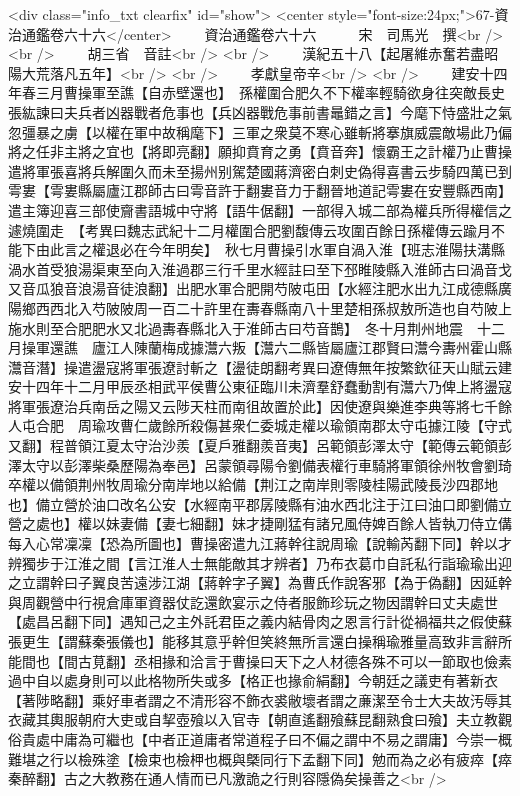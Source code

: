 <div class="info_txt clearfix" id="show">
<center style="font-size:24px;">67-資治通鑑卷六十六</center>
  　　資治通鑑卷六十六　　　宋　司馬光　撰<br />
<br />
　　胡三省　音註<br />
<br />
　　漢紀五十八【起屠維赤奮若盡昭陽大荒落凡五年】<br />
<br />
　　孝獻皇帝辛<br />
<br />
　　建安十四年春三月曹操軍至譙【自赤壁還也】　孫權圍合肥久不下權率輕騎欲身往突敵長史張紘諫曰夫兵者凶器戰者危事也【兵凶器戰危事前書鼂錯之言】今麾下恃盛壯之氣忽彊暴之虜【以權在軍中故稱麾下】三軍之衆莫不寒心雖斬將搴旗威震敵場此乃偏將之任非主將之宜也【將即亮翻】願抑賁育之勇【賁音奔】懷霸王之計權乃止曹操遣將軍張喜將兵解圍久而未至揚州别駕楚國蔣濟密白刺史偽得喜書云步騎四萬已到雩婁【雩婁縣屬廬江郡師古曰雩音許于翻婁音力于翻晉地道記雩婁在安豐縣西南】遣主簿迎喜三部使齎書語城中守將【語牛倨翻】一部得入城二部為權兵所得權信之遽燒圍走　【考異曰魏志武紀十二月權圍合肥劉馥傳云攻圍百餘日孫權傳云踰月不能下由此言之權退必在今年明矣】　秋七月曹操引水軍自渦入淮【班志淮陽扶溝縣渦水首受狼湯渠東至向入淮過郡三行千里水經註曰至下邳睢陵縣入淮師古曰渦音戈又音瓜狼音浪湯音徒浪翻】出肥水軍合肥開芍陂屯田【水經注肥水出九江成德縣廣陽鄉西西北入芍陂陂周一百二十許里在夀春縣南八十里楚相孫叔敖所造也自芍陂上施水則至合肥肥水又北過夀春縣北入于淮師古曰芍音鵲】　冬十月荆州地震　十二月操軍還譙　廬江人陳蘭梅成據灊六叛【灊六二縣皆屬廬江郡賢曰灊今夀州霍山縣灊音潛】操遣盪寇將軍張遼討斬之【盪徒朗翻考異曰遼傳無年按繁欽征天山賦云建安十四年十二月甲辰丞相武平侯曹公東征臨川未濟羣舒蠢動割有灊六乃俾上將盪寇將軍張遼治兵南岳之陽又云陟天柱而南徂故置於此】因使遼與樂進李典等將七千餘人屯合肥　周瑜攻曹仁歲餘所殺傷甚衆仁委城走權以瑜領南郡太守屯據江陵【守式又翻】程普領江夏太守治沙羨【夏戶雅翻羨音夷】呂範領彭澤太守【範傳云範領彭澤太守以彭澤柴桑歷陽為奉邑】呂蒙領尋陽令劉備表權行車騎將軍領徐州牧會劉琦卒權以備領荆州牧周瑜分南岸地以給備【荆江之南岸則零陵桂陽武陵長沙四郡地也】備立營於油口改名公安【水經南平郡孱陵縣有油水西北注于江曰油口即劉備立營之處也】權以妹妻備【妻七細翻】妹才捷剛猛有諸兄風侍婢百餘人皆執刀侍立傋每入心常凜凜【恐為所圖也】曹操密遣九江蔣幹往說周瑜【說輸芮翻下同】幹以才辨獨步于江淮之間【言江淮人士無能敵其才辨者】乃布衣葛巾自託私行詣瑜瑜出迎之立謂幹曰子翼良苦遠涉江湖【蔣幹字子翼】為曹氏作說客邪【為于偽翻】因延幹與周觀營中行視倉庫軍資器仗訖還飲宴示之侍者服飾珍玩之物因謂幹曰丈夫處世【處昌呂翻下同】遇知己之主外託君臣之義内結骨肉之恩言行計從禍福共之假使蘇張更生【謂蘇秦張儀也】能移其意乎幹但笑終無所言還白操稱瑜雅量高致非言辭所能間也【間古莧翻】丞相掾和洽言于曹操曰天下之人材德各殊不可以一節取也儉素過中自以處身則可以此格物所失或多【格正也掾俞絹翻】今朝廷之議吏有著新衣【著陟略翻】乘好車者謂之不清形容不飾衣裘敝壞者謂之亷潔至令士大夫故汚辱其衣藏其輿服朝府大吏或自挈壺飱以入官寺【朝直遙翻飱蘇昆翻熟食曰飱】夫立教觀俗貴處中庸為可繼也【中者正道庸者常道程子曰不偏之謂中不易之謂庸】今崇一概難堪之行以檢殊塗【檢束也檢柙也概與槩同行下孟翻下同】勉而為之必有疲瘁【瘁秦醉翻】古之大教務在通人情而已凡激詭之行則容隱偽矣操善之<br />

